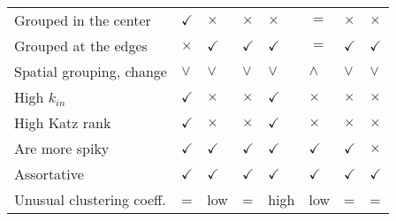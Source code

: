 \begin{tabular}{llllllll}
Grouped in the center & $\checkmark$ & $\times$ & $\times$ & $\times$ & $=$ & $\times$ & $\times$\\
Grouped at the edges & $\times$ & $\checkmark$ & $\checkmark$ & $\checkmark$ & $=$ & $\checkmark$ & $\checkmark$\\
Spatial grouping, change & $\lor$ & $\lor$ & $\lor$ & $\lor$ & $\land$ & $\lor$ & $\lor$ \\
High $k_{in}$ & $\checkmark$ & $\times$ & $\times$ & $\checkmark$ & $\times$ & $\times$ & $\times$\\
High Katz rank & $\checkmark$ & $\times$ & $\times$ & $\checkmark$ & $\times$ & $\times$ & $\times$\\
Are more spiky & $\checkmark$ & $\checkmark$ & $\checkmark$ & $\checkmark$ & $\checkmark$ & $\checkmark$ & $\times$\\
Assortative& $\checkmark$ & $\checkmark$ & $\checkmark$ & $\checkmark$ & $\checkmark$ & $\checkmark$ & $\checkmark$\\
Unusual clustering coeff.& = & low & = & high & low & = & =\\
\end{tabular}
